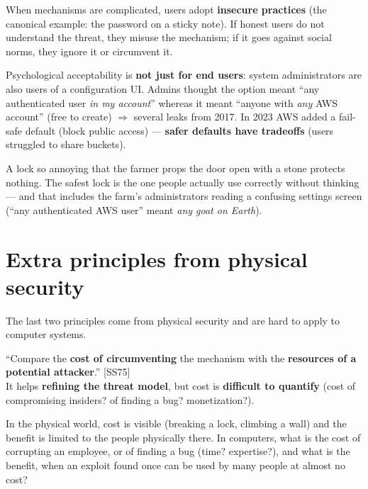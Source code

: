 \begin{rembox}[title=Why it matters]
When mechanisms are complicated, users adopt \textbf{insecure practices} (the canonical example:
the password on a sticky note). If honest users do not understand the threat, they misuse the
mechanism; if it goes against social norms, they ignore it or circumvent it.
\end{rembox}

\begin{exbox}[title=Amazon S3 ``Any Authenticated AWS User'']
Psychological acceptability is \textbf{not just for end users}: system administrators
are also users of a configuration UI. Admins thought the option meant ``any
authenticated user \emph{in my account}'' whereas it meant ``anyone with \emph{any} AWS
account'' (free to create) $\Rightarrow$ several leaks from 2017. In 2023 AWS added a
fail-safe default (block public access) --- \textbf{safer defaults have tradeoffs}
(users struggled to share buckets).
\end{exbox}

\begin{goatbox}
A lock so annoying that the farmer props the door open with a stone protects nothing. The
safest lock is the one people actually use correctly without thinking --- and that includes the
farm's administrators reading a confusing settings screen (``any authenticated AWS user'' meant
\emph{any goat on Earth}).
\end{goatbox}

\section{Extra principles from physical security}

\begin{warnbox}[title=Difficult to transpose to computer security!]
The last two principles come from physical security and are hard to apply to computer
systems.
\end{warnbox}

\begin{defnbox}[title=9 -- Work factor]
``Compare the \textbf{cost of circumventing} the mechanism with the \textbf{resources of
a potential attacker}.'' [SS75] \\
It helps \textbf{refining the threat model}, but cost is \textbf{difficult to
quantify} (cost of compromising insiders? of finding a bug? monetization?).
\end{defnbox}

\begin{rembox}[title=Why it transposes badly]
In the physical world, cost is visible (breaking a lock, climbing a wall) and the benefit is
limited to the people physically there. In computers, what is the cost of corrupting an employee,
or of finding a bug (time? expertise?), and what is the benefit, when an exploit found once can be
used by many people at almost no cost?
\end{rembox}

